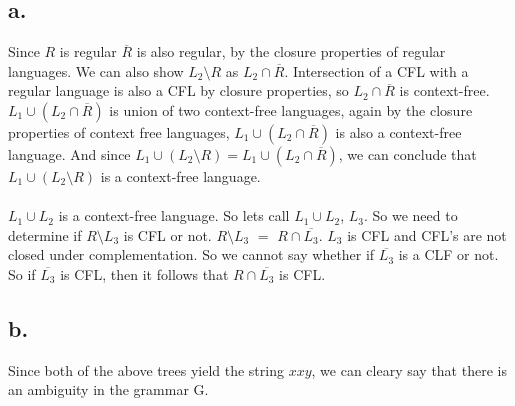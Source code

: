 \documentclass[12pt]{article}
\begin{document}
\subsection*{a.}
Since $R$ is regular $\overline{R}$ is also regular, by the closure properties of regular languages. We can also show $L_2\setminus R$ as $L_2 \cap \overline{R}$. Intersection of a CFL with a regular language is also a CFL by closure properties, so  $L_2 \cap \overline{R}$ is context-free. $L_1 \cup (L_2 \cap \overline{R})$ is union of two context-free languages, again by the closure properties of context free languages, $L_1 \cup (L_2 \cap \overline{R})$ is also a context-free language. And since $L_1 \cup (L_2 \setminus R ) = L_1 \cup (L_2 \cap \overline{R})$, we can conclude that $L_1 \cup (L_2 \setminus R )$ is a context-free language.
\\
\\
$L_1 \cup L_2$ is a context-free language. So lets call $L_1 \cup L_2$, $L_3$. So we need to determine if $R\setminus L_3$ is CFL or not. $ R\setminus L_3 $ $=$ $ R \cap \overline{L_3}$. $L_3$ is CFL and CFL's are not closed under complementation. So we cannot say whether if $ \overline{L_3} $ is a CLF or not. So if $\overline{L_3}$ is CFL, then it follows that $R \cap \overline{L_3}$ is CFL.
\subsection*{b.}


Since both of the above trees yield the string $xxy$, we can cleary say that there is an ambiguity in the grammar G.
\end{document}
